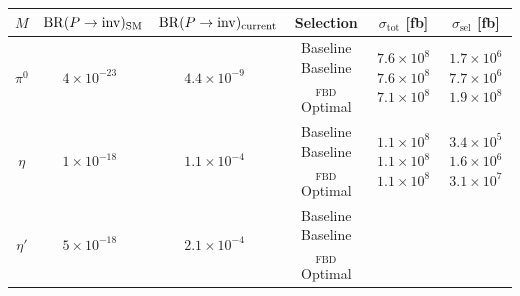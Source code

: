 \documentclass[aps,prd,preprintnumbers,superscriptaddress,nofootinbib,floatfix,twocolumn,notitlepage,reprint]{revtex4-2}
\begin{document}
\begin{table}
\centering
\begin{tabular}{|c|c|c|c|c|c|}
\hline
$M$
& $\mathrm{BR}(P\to \mathrm{inv})_{\rm SM}$
& $\mathrm{BR}(P\to \mathrm{inv})_{\rm current}$
& Selection
& $\sigma_{\text{tot}}$ [fb]
& $\sigma_{\text{sel}}$ [fb]
\\
\hline\hline
$\pi^0$
& $4\times10^{-23}$~\cite{Gao:2018seg}
& $4.4\times10^{-9}$~\cite{NA62:2020pwi}
& \makecell{Baseline \\ Baseline$_{\text{FBD}}$ \\ Optimal}
& \makecell{$7.6\times10^{8}$ \\ $7.6\times10^{8}$ \\ $7.1\times10^{8}$}
& \makecell{$1.7\times10^{6}$ \\ $7.7\times10^{6}$ \\ $1.9\times10^{8}$}
\\
\hline
$\eta$
& $1\times10^{-18}$~\cite{Gao:2018seg}
& $1.1\times10^{-4}$~\cite{NA64:2024mah}
& \makecell{Baseline \\ Baseline$_{\text{FBD}}$ \\ Optimal}
& \makecell{$1.1\times10^{8}$ \\ $1.1\times10^{8}$ \\ $1.1\times10^{8}$}
& \makecell{$3.4\times10^{5}$ \\ $1.6\times10^{6}$ \\ $3.1\times10^{7}$}
\\
\hline
$\eta'$
& $5\times10^{-18}$~\cite{Gao:2018seg}
& $2.1\times10^{-4}$~\cite{NA64:2024mah}
& \makecell{Baseline \\ Baseline$_{\text{FBD}}$ \\ Optimal}

\end{tabular}
\end{table}
\end{document}
